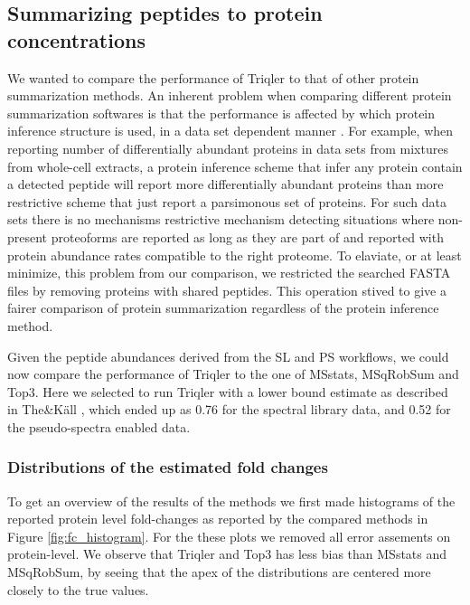 \documentclass[10pt,letterpaper]{article}
\begin{document}
\subsection*{Summarizing peptides to protein concentrations}

We wanted to compare the performance of Triqler to that of other protein summarization methods. An inherent problem when comparing different protein summarization softwares is that the performance is affected by which protein inference structure is used, in a data set dependent manner \cite{serang2012recognizing}. For example, when reporting number of differentially abundant proteins in data sets from mixtures from whole-cell extracts, a protein inference scheme that infer any protein contain a detected peptide will report more differentially abundant proteins than more restrictive scheme that just report a parsimonous set of proteins. For such data sets there is no mechanisms restrictive mechanism detecting situations where non-present proteoforms are reported as long as they are part of and reported with protein abundance rates compatible to the right proteome. To elaviate, or at least minimize, this problem from our comparison, we restricted the searched FASTA files by removing proteins with shared peptides. This operation stived to 
give a fairer comparison of protein summarization regardless of the protein inference method.

Given the peptide abundances derived from the SL and PS workflows, we could now compare the performance of Triqler to the one of MSstats, MSqRobSum and Top3. Here we selected to run Triqler with a lower bound estimate as described in The\&K\"{a}ll \cite{the2021triqler}, which ended up as 0.76 for the spectral library data, and 0.52 for the pseudo-spectra enabled data.

\subsubsection*{Distributions of the estimated fold changes}

To get an overview of the results of the methods we first made histograms of the reported protein level fold-changes as reported by the compared methods in Figure \ref{fig:fc_histogram}. For the these plots we removed all error assements on protein-level. We observe that Triqler and Top3 has less bias than MSstats and MSqRobSum, by seeing that the apex of the distributions are centered more closely to the true values.  %
\end{document}
